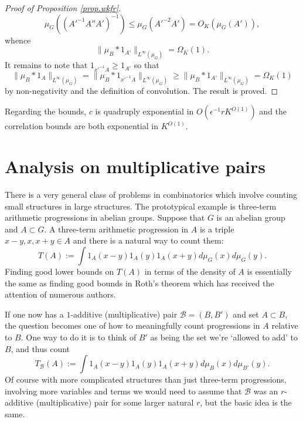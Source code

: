 \documentclass[12pt]{amsart}
\numberwithin{equation}{section}
\theoremstyle{plain}
\theoremstyle{definition}
\renewcommand{\leq}{\leqslant}
\renewcommand{\geq}{\geqslant}
\begin{document}
\begin{proof}[Proof of Proposition \ref{prop.wkfr}]
\begin{equation*}
\mu_G((A'^{-1}A''A')^{-1})\leq \mu_G(A'^{-2}A') =O_K(\mu_G(A')),
\end{equation*}
whence
\begin{equation*}
\|\mu_{B} \ast 1_{A'}\|_{L^\infty(\mu_G)} = \Omega_K(1).
\end{equation*}
It remains to note that $1_{x'^{-1}A} \geq 1_{A'}$ so that
\begin{equation*}
\|\mu_{B} \ast 1_{A}\|_{L^\infty(\mu_G)}=\|\mu_{B} \ast 1_{x'^{-1}A}\|_{L^\infty(\mu_G)}\geq \|\mu_{B} \ast 1_{A'}\|_{L^\infty(\mu_G)}=\Omega_K(1)
\end{equation*}
by non-negativity and the definition of convolution.  The result is proved.
\end{proof}
Regarding the bounds, $c$ is quadruply exponential in $O(\epsilon^{-1}rK^{O(1)})$ and the correlation bounds are both exponential in $K^{O(1)}$.

\section{Analysis on multiplicative pairs}\label{sec.locpsa}

There is a very general class of problems in combinatorics which involve counting small structures in large structures.  The prototypical example is three-term arithmetic progressions in abelian groups.  Suppose that $G$ is an abelian group and $A \subset G$. A three-term arithmetic progression in $A$ is a triple $x-y,x,x+y \in A$ and there is a natural way to count them:
\begin{equation*}
T(A):=\int{1_A(x-y)1_A(y)1_A(x+y)d\mu_G(x)d\mu_G(y)}.
\end{equation*}
Finding good lower bounds on $T(A)$ in terms of the density of $A$ is essentially the same as finding good bounds in Roth's theorem \cite{KFR} which has received the attention of numerous authors.

If one now has a $1$-additive (multiplicative) pair $\mathcal{B}=(B,B')$ and set $A \subset B$, the question becomes one of how to meaningfully count progressions in $A$ relative to $B$.  One way to do it is to think of $B'$ as being the set we're `allowed to add' to $B$, and thus count
\begin{equation*}
T_\mathcal{B}(A):=\int{1_A(x-y)1_A(y)1_A(x+y)d\mu_B(x)d\mu_{B'}(y)}.
\end{equation*}
Of course with more complicated structures than just three-term progressions, involving more variables and terms we would need to assume that $\mathcal{B}$ was an $r$-additive (multiplicative) pair for some larger natural $r$, but the basic idea is the same.
\end{document}
